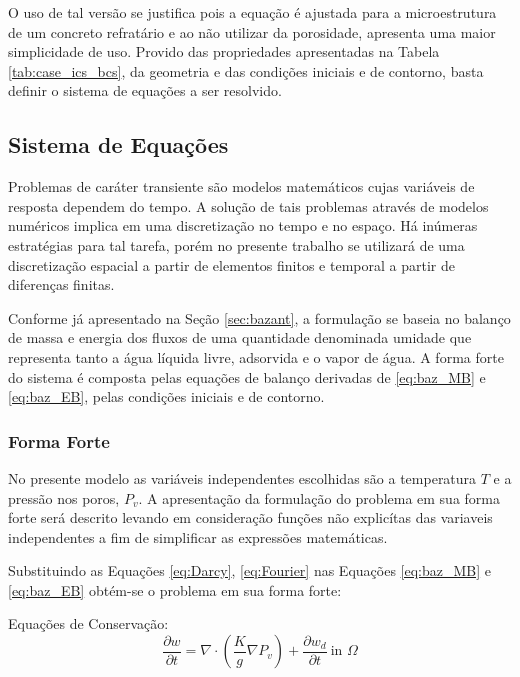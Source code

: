     O uso de tal versão se justifica pois a equação é ajustada para a
    microestrutura de um concreto refratário \cite{Gong1995a} e ao não utilizar
    da porosidade, apresenta uma maior simplicidade de uso. Provido das
    propriedades apresentadas na Tabela \ref{tab:case_ics_bcs}, da geometria e
    das condições iniciais e de contorno, basta definir o sistema de equações a
    ser resolvido.

    \subsection{Sistema de Equações}\label{mat:eqs}
    Problemas de caráter transiente são modelos matemáticos cujas variáveis de
    resposta dependem do tempo. A solução de tais problemas através de modelos
    numéricos implica em uma discretização no tempo e no espaço. Há inúmeras
    estratégias para tal tarefa, porém no presente trabalho se utilizará de uma
    discretização espacial a partir de elementos finitos e temporal a partir de
    diferenças finitas.

    Conforme já apresentado na Seção \ref{sec:bazant}, a formulação se baseia no
    balanço de massa e energia dos fluxos de uma quantidade denominada umidade
    que representa tanto a água líquida livre, adsorvida e o vapor de água. A
    forma forte do sistema é composta pelas equações de balanço derivadas de
    \ref{eq:baz_MB} e \ref{eq:baz_EB}, pelas condições iniciais e de contorno. 
    
    \subsubsection{Forma Forte}\label{mat:forte}
    No presente modelo as variáveis independentes escolhidas são a temperatura
    $T$ e a pressão nos poros, $P_v$. A apresentação da formulação do problema em
    sua forma forte será descrito levando em consideração funções não explicítas
    das variaveis independentes a fim de simplificar as expressões matemáticas.

    
    Substituindo as Equações \ref{eq:Darcy}, \ref{eq:Fourier} nas
    Equações  \ref{eq:baz_MB} e \ref{eq:baz_EB} obtém-se o problema em sua forma
    forte:  

    Equações de Conservação:
   \begin{equation}
     \label{eq:full_MB}
     \frac{\partial w}{\partial t}  = \nabla \cdot \left(\frac{K}{g} \nabla P_v \right) + \frac{\partial w_d}{\partial t} \ \text{in } \Omega
   \end{equation}

